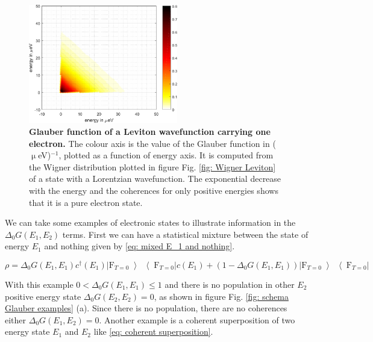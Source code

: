 \begin{figure}[hptb]
	\begin{center}
		\includegraphics[width = 6.5cm]{./chap1/glauber_leviton_f_200MHz_tau_80ps_1microK_1e}
	\end{center}
	\caption{\textbf{Glauber function of a Leviton wavefunction carrying one electron.} The colour axis is the value of the Glauber function in ($\upmu$eV)$^{-1}$, plotted as a function of energy axis. It is computed from the Wigner distribution plotted in figure Fig. \ref{fig: Wigner Leviton} of a state with a Lorentzian wavefunction. The exponential decrease with the energy and the coherences for only positive energies shows that it is a pure electron state.}
	\label{fig: Glauber Leviton}
\end{figure}

We can take some examples of electronic states to illustrate information in the $\Delta_{0}G\left(E_{1},E_{2}\right)$ terms.
First we can have a statistical mixture between the state of energy $E_{1}$ and nothing given by \eqref{eq: mixed E_1 and nothing}.

\begin{equation}
\rho = \Delta_{0}G\left(E_1,E_1\right)c^{\dagger}\left(E_{1}\right)\left|\mathrm{F}_{T=0}\left>\right<\mathrm{F}_{T=0}\right|c\left(E_{1}\right)+\left(1-\Delta_{0}G\left(E_{1},E_{1}\right)\right)\left|\mathrm{F}_{T=0}\left>\right<\mathrm{F}_{T=0}\right| \label{eq: mixed E_1 and nothing}
\end{equation}

With this example $0 < \Delta_{0}G\left(E_{1},E_{1}\right) \leq 1$ and there is no population in other $E_{2}$ positive energy state $\Delta_{0}G\left(E_{2},E_{2}\right) = 0$, as shown in figure Fig. \ref{fig: schema Glauber examples} (a).
Since there is no population, there are no coherences either $\Delta_{0}G\left(E_{1},E_{2}\right) = 0$.
Another example is a coherent superposition of two energy state $E_{1}$ and $E_{2}$ like \eqref{eq: coherent superposition}.

